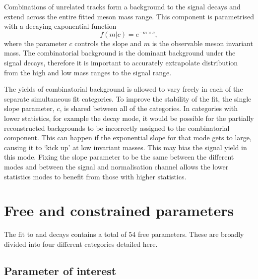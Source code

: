 Combinations of unrelated tracks form a background to the signal decays and extend across the entire fitted \Bp meson mass range. 
This component is parametrised with a decaying exponential function 
\begin{equation}
f(m|c) = e^{-m\times c},
\end{equation}
where the parameter $c$ controls the slope and $m$ is the observable \Bp meson invariant mass. 
The combinatorial background is the dominant background under the signal decays, therefore it is important to accurately extrapolate distribution from the high and low mass ranges to the signal range. 

The yields of combinatorial background is allowed to vary freely in each of the separate simultaneous fit categories. To improve the stability of the fit, the single slope parameter, $c$, is shared between all of the categories. In categories with lower statistics, for example the \decay{\Dsp}{\Kp\pim\pip} decay mode, it would be possible for the partially reconstructed backgrounds to be incorrectly assigned to the combinatorial component. This can happen if the exponential slope for that mode gets to large, causing it to `kick up' at low invariant masses. This may bias the signal yield in this mode. Fixing the slope parameter to be the same between the different \Dsp modes and between the signal and normalisation channel allows the lower statistics modes to benefit from those with higher statistics.

\section{Free and constrained parameters}

The fit to \decay{\Bp}{\Dsp\phiz} and \decay{\Bp}{\Dsp\Dzb} decays contains a total of 54 free parameters. 
These are broadly divided into four different categories detailed here.


\subsection{Parameter of interest}

